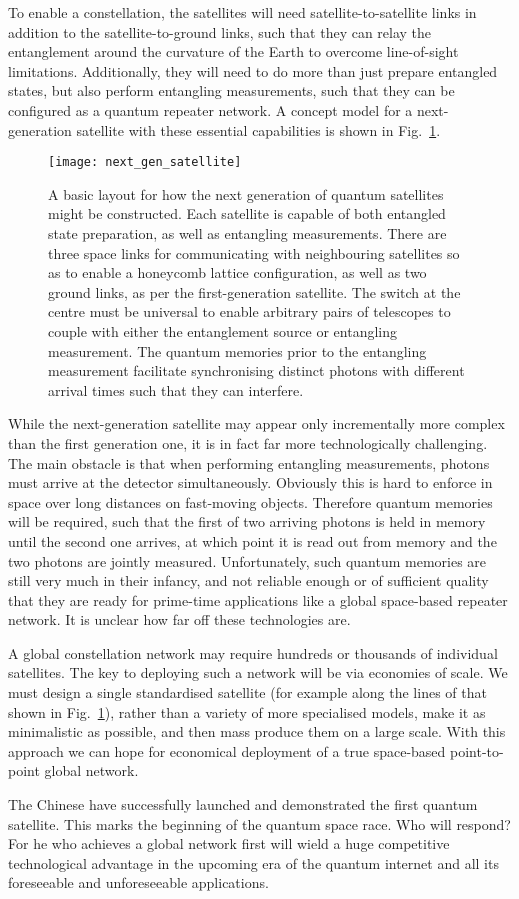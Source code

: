 To enable a constellation, the satellites will need satellite-to-satellite links in addition to the satellite-to-ground links, such that they can relay the entanglement around the curvature of the Earth to overcome line-of-sight limitations. Additionally, they will need to do more than just prepare entangled states, but also perform entangling measurements, such that they can be configured as a quantum repeater network. A concept model for a next-generation satellite with these essential capabilities is shown in Fig.~\ref{fig:next_gen_sat}.

\begin{figure}[!htb]
\texttt{[image: next\_gen\_satellite]}
\caption{A basic layout for how the next generation of quantum satellites might be constructed. Each satellite is capable of both entangled state preparation, as well as entangling measurements. There are three space links for communicating with neighbouring satellites so as to enable a honeycomb lattice configuration, as well as two ground links, as per the first-generation satellite. The switch at the centre must be universal to enable arbitrary pairs of telescopes to couple with either the entanglement source or entangling measurement. The quantum memories prior to the entangling measurement facilitate synchronising distinct photons with different arrival times such that they can interfere.}\label{fig:next_gen_sat}	
\end{figure}

While the next-generation satellite may appear only incrementally more complex than the first generation one, it is in fact far more technologically challenging. The main obstacle is that when performing entangling measurements, photons must arrive at the detector simultaneously. Obviously this is hard to enforce in space over long distances on fast-moving objects. Therefore quantum memories will be required, such that the first of two arriving photons is held in memory until the second one arrives, at which point it is read out from memory and the two photons are jointly measured. Unfortunately, such quantum memories are still very much in their infancy, and not reliable enough or of sufficient quality that they are ready for prime-time applications like a global space-based repeater network. It is unclear how far off these technologies are.

A global constellation network may require hundreds or thousands of individual satellites. The key to deploying such a network will be via economies of scale. We must design a single standardised satellite (for example along the lines of that shown in Fig.~\ref{fig:next_gen_sat}), rather than a variety of more specialised models, make it as minimalistic as possible, and then mass produce them on a large scale. With this approach we can hope for economical deployment of a true space-based point-to-point global network.

The Chinese have successfully launched and demonstrated the first quantum satellite. This marks the beginning of the quantum space race. Who will respond? For he who achieves a global network first will wield a huge competitive technological advantage in the upcoming era of the quantum internet and all its foreseeable and unforeseeable applications.